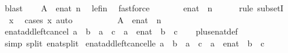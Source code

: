 \begin{isabellebody}
\ blast\isanewline
\ \ \isamarkupfalse%
\ {\isachardoublequoteopen}A\ {\isasymsubseteq}\ {\isacharbraceleft}{\isachardot}{\isachardot}enat\ n{\isacharbraceright}{\isachardoublequoteclose}\ \isamarkupfalse%
\ le{\isacharunderscore}fin\ \isamarkupfalse%
\ fastforce\isanewline
\ \ \isamarkupfalse%
\ \isamarkupfalse%
\ {\isachardoublequoteopen}{\isasymdots}\ {\isasymsubseteq}\ enat\ {\isacharbackquote}\ {\isacharbraceleft}{\isachardot}{\isachardot}n{\isacharbraceright}{\isachardoublequoteclose}\isanewline
\ \ \ \ \isamarkupfalse%
\ {\isacharparenleft}rule\ subsetI{\isacharparenright}\isanewline
\ \ \ \ \isamarkupfalse%
\ \ x\ \isamarkupfalse%
\ {\isacharparenleft}cases\ x{\isacharparenright}\ auto\isanewline
\ \ \ \ \isamarkupfalse%
\isanewline
\ \ \isamarkupfalse%
\ \isamarkupfalse%
\ {\isachardoublequoteopen}A\ {\isasymsubseteq}\ enat\ {\isacharbackquote}\ {\isacharbraceleft}{\isachardot}{\isachardot}n{\isacharbraceright}{\isachardoublequoteclose}\ \isacommand{{\isachardot}}\isamarkupfalse%
\isanewline
{}\isamarkupfalse%
%
\endisatagproof
{\isafoldproof}%
%
\isadelimproof
%
\endisadelimproof
%
\isadelimdocument
%
\endisadelimdocument
%
\isatagdocument
%
\isamarkuptrue%
%
\endisatagdocument
{\isafolddocument}%
%
\isadelimdocument
%
\endisadelimdocument
{}\isamarkupfalse%
\ enat{\isacharunderscore}add{\isacharunderscore}left{\isacharunderscore}cancel{\isacharcolon}\ {\isachardoublequoteopen}a\ {\isacharplus}\ b\ {\isacharequal}\ a\ {\isacharplus}\ c\ {\isasymlongleftrightarrow}\ a\ {\isacharequal}\ {\isacharparenleft}{\isasyminfinity}{\isacharcolon}{\isacharcolon}enat{\isacharparenright}\ {\isasymor}\ b\ {\isacharequal}\ c{\isachardoublequoteclose}\isanewline
%
\isadelimproof
\ \ %
\endisadelimproof
%
\isatagproof
{}\isamarkupfalse%
\ plus{\isacharunderscore}enat{\isacharunderscore}def\ \isamarkupfalse%
\ {\isacharparenleft}simp\ split{\isacharcolon}\ enat{\isachardot}split{\isacharparenright}%
\endisatagproof
{\isafoldproof}%
%
\isadelimproof
\isanewline
%
\endisadelimproof
\isanewline
{}\isamarkupfalse%
\ enat{\isacharunderscore}add{\isacharunderscore}left{\isacharunderscore}cancel{\isacharunderscore}le{\isacharcolon}\ {\isachardoublequoteopen}a\ {\isacharplus}\ b\ {\isasymle}\ a\ {\isacharplus}\ c\ {\isasymlongleftrightarrow}\ a\ {\isacharequal}\ {\isacharparenleft}{\isasyminfinity}{\isacharcolon}{\isacharcolon}enat{\isacharparenright}\ {\isasymor}\ b\ {\isasymle}\ c{\isachardoublequoteclose}\isanewline

\end{isabellebody}
